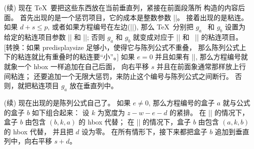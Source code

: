 \ddanger (续) 现在 \TeX\ 要把这些东西放在当前垂直列，紧接在前面段落所%
构造的内容后面。%
首先出现的是一个惩罚项目，它的成本是整数参数 |\predisplaypenalty|。%
接着出现的是粘连。%
如果 $d+s\le p$, 或者如果方程编号在左边(|\leqno|), 那么 \TeX\ 分别把 $g_a$~%
和 $g_b$ 设置为给定的粘连项目参数 |\abovedisplayskip| 和 |\belowdisplayskip|;
否则 $g_a$ 和 $g_b$ 就变成对应于 |\abovedisplayshortskip| 和%
~|\belowdisplayshortskip| 的粘连项目。%
[转换：如果 predisplaysize 足够小，使得它与陈列公式不重叠，
那么陈列公式上下的粘连就比有重叠时的粘连要``小''。]
如果 $e=0$ 并且如果有 |\leqno|, 那么方程编号就就象一个 hbox 一样追加在自己后面，
向右平移 $s$ 并且在前面象通常那样放上行间粘连；
还要追加一个无限大惩罚，来防止这个编号与陈列公式之间断行。%
否则，就把粘连项目 $g_a$ 放在垂直列中。

\ddanger (续) 现在出现的是陈列公式自己了。%
如果 $e\ne 0$, 那么方程编号的盒子 $a$ 就与公式的盒子 $b$ 如下组合起来：
设 $k$ 为宽度为 $z-w-e-d$ 的紧排。%
在 |\eqno| 的情况下，盒子 $b$ 由包含 $(b,k,a)$ 的 hbox 代替；
在 |\leqno| 的情况下，盒子 $b$ 由包含 $(a,k,b)$ 的 hbox 代替，
并且把 $d$ 设为零。%
在所有情形下，接下来都把盒子 $b$ 追加到垂直列中，向右平移 $s+d$。

